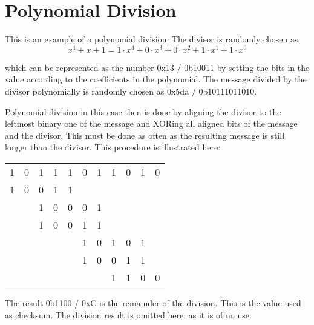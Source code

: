 \section{Polynomial Division}\label{polynomial_division}
This is an example of a polynomial division. The divisor is randomly chosen as
\begin{equation}
  x^4 + x + 1 = 1 \cdot x^4 + 0 \cdot x^3 + 0 \cdot x^2 + 1 \cdot x^1 + 1 \cdot x^0
\end{equation}

which can be represented as the number 0x13 / 0b10011 by setting the bits in the value according to the coefficients in the polynomial. The message divided by the divisor polynomially is randomly chosen as 0x5da / 0b10111011010.

Polynomial division in this case then is done by aligning the divisor to the leftmost binary one of the message and XORing all aligned bits of the message and the divisor. This must be done as often as the resulting message is still longer than the divisor. This procedure is illustrated here:

\begin{center}
  \begin{tabular}{*{11}{@{}c@{}}}
    1&0&1&1&1&0&1&1&0&1&0\\
    1&0&0&1&1\\ 
    ~&~&1&0&0&0&1\\
    ~&~&1&0&0&1&1\\ 
    ~&~&~&~&~&1&0&1&0&1\\
    ~&~&~&~&~&1&0&0&1&1\\ 
    ~&~&~&~&~&~&~&1&1&0&0
  \end{tabular}
\end{center}

The result 0b1100 / 0xC is the remainder of the division. This is the value used as checksum. The division result is omitted here, as it is of no use.